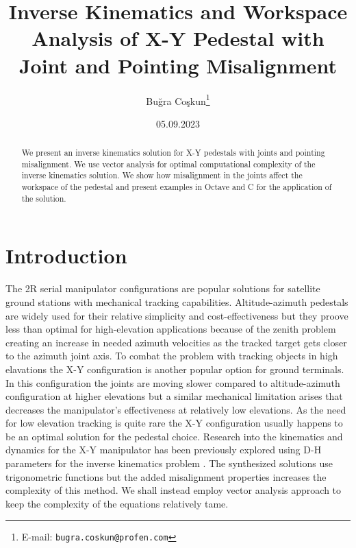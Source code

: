 \documentclass[a4paper,onecolumn,11pt]{article}
\begin{document}
\title{Inverse Kinematics and Workspace Analysis of X-Y Pedestal
with Joint and Pointing Misalignment } 
\author{Buğra Coşkun\thanks{E-mail:
\texttt{bugra.coskun@profen.com}}}

\date{\vspace{-2ex}\scriptsize05.09.2023}
\maketitle
\vspace{-5ex}
\normalsize

\begin{abstract}
    We present an inverse kinematics solution for X-Y pedestals with joints and
    pointing misalignment. We use vector analysis for optimal computational
    complexity of the inverse kinematics solution. We show how misalignment in
    the joints affect the workspace of the pedestal and present examples in
    Octave and C for the application of the solution. 
\end{abstract}

\normalsize
\section*{Introduction}
The 2R serial manipulator configurations are popular solutions for satellite
ground stations with mechanical tracking capabilities.
Altitude-azimuth pedestals are widely used for their relative simplicity and
cost-effectiveness but they proove less than optimal for high-elevation 
applications because
of the zenith problem creating an increase in needed azimuth
velocities\cite{ji2003} as the tracked target gets closer to the azimuth joint
axis. To combat the problem with tracking objects in high
elavations the X-Y configuration is another popular option for ground
terminals. In this configuration the joints are moving slower compared to
altitude-azimuth configuration at higher elevations but a similar mechanical
limitation arises that decreases the manipulator's effectiveness at relatively
low elevations. As the need for low elevation tracking is quite rare the X-Y
configuration usually happens to be an optimal solution for the pedestal
choice\cite{willey2000}. Research into the kinematics and dynamics for the X-Y
manipulator has been previously explored using D-H parameters for the inverse
kinematics problem \cite{tehrani2014}. The synthesized solutions use
trigonometric functions but the added misalignment properties increases the
complexity of this method. We shall instead employ vector analysis approach to
keep the complexity of the equations relatively tame.
\end{document}
